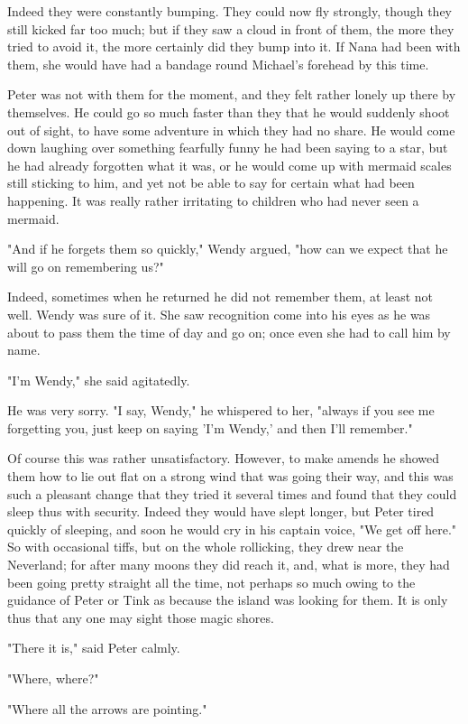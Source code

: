 Indeed they were constantly bumping.
They could now fly strongly, though they still kicked far too much;
but if they saw a cloud in front of them, the more they tried to avoid it, the more certainly did they bump into it.
If Nana had been with them, she would have had a bandage round Michael's forehead by this time.

Peter was not with them for the moment, and they felt rather lonely up there by themselves.
He could go so much faster than they that he would suddenly shoot out of sight, to have some adventure in which they had no share.
He would come down laughing over something fearfully funny he had been saying to a star, but he had already forgotten what it was, or he would come up with mermaid scales still sticking to him, and yet not be able to say for certain what had been happening.
It was really rather irritating to children who had never seen a mermaid.

"And if he forgets them so quickly," Wendy argued, "how can we expect that he will go on remembering us?"

Indeed, sometimes when he returned he did not remember them, at least not well.
Wendy was sure of it.
She saw recognition come into his eyes as he was about to pass them the time of day and go on;
once even she had to call him by name.

"I'm Wendy," she said agitatedly.

He was very sorry.
"I say, Wendy," he whispered to her, "always if you see me forgetting you, just keep on saying 'I'm Wendy,' and then I'll remember."

Of course this was rather unsatisfactory.
However, to make amends he showed them how to lie out flat on a strong wind that was going their way, and this was such a pleasant change that they tried it several times and found that they could sleep thus with security.
Indeed they would have slept longer, but Peter tired quickly of sleeping, and soon he would cry in his captain voice, "We get off here."
So with occasional tiffs, but on the whole rollicking, they drew near the Neverland;
for after many moons they did reach it, and, what is more, they had been going pretty straight all the time, not perhaps so much owing to the guidance of Peter or Tink as because the island was looking for them.
It is only thus that any one may sight those magic shores.

"There it is," said Peter calmly.

"Where, where?"

"Where all the arrows are pointing."

